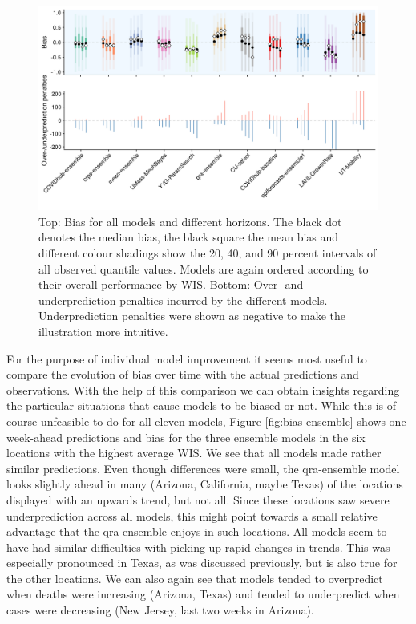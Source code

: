 \documentclass[
]{book}
\begin{document}
\begin{figure}
\includegraphics[width=1\linewidth]{../visualisation/chapter-5-results/scenario-baseline/prediction-penalties-and-bias} \caption{Top: Bias for all models and different horizons. The black dot denotes the median bias, the black square the mean bias and different colour shadings show the 20, 40, and 90 percent intervals of all observed quantile values. Models are again ordered according to their overall performance by WIS. Bottom: Over- and underprediction penalties incurred by the different models. Underprediction penalties were shown as negative to make the illustration more intuitive.}\label{fig:bias-all}
\end{figure}

For the purpose of individual model improvement it seems most useful to compare the evolution of bias over time with the actual predictions and observations. With the help of this comparison we can obtain insights regarding the particular situations that cause models to be biased or not. While this is of course unfeasible to do for all eleven models, Figure \ref{fig:bias-ensemble} shows one-week-ahead predictions and bias for the three ensemble models in the six locations with the highest average WIS. We see that all models made rather similar predictions. Even though differences were small, the qra-ensemble model looks slightly ahead in many (Arizona, California, maybe Texas) of the locations displayed with an upwards trend, but not all. Since these locations saw severe underprediction across all models, this might point towards a small relative advantage that the qra-ensemble enjoys in such locations. All models seem to have had similar difficulties with picking up rapid changes in trends. This was especially pronounced in Texas, as was discussed previously, but is also true for the other locations. We can also again see that models tended to overpredict when deaths were increasing (Arizona, Texas) and tended to underpredict when cases were decreasing (New Jersey, last two weeks in Arizona).
\end{document}

